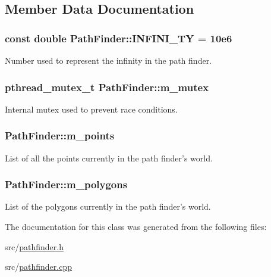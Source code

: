 \subsection{Member Data Documentation}
\hypertarget{classPathFinder_a341ee3901465d58e8aad2fc0dd227168}{
\subsubsection[{INFINI\_\-TY}]{\setlength{\rightskip}{0pt plus 5cm}const double {\bf PathFinder::INFINI\_\-TY} = 10e6}}
\label{classPathFinder_a341ee3901465d58e8aad2fc0dd227168}
Number used to represent the infinity in the path finder. \hypertarget{classPathFinder_a4a70aef3998ffdbcbf20bb67a0f884e2}{
\subsubsection[{m\_\-mutex}]{\setlength{\rightskip}{0pt plus 5cm}pthread\_\-mutex\_\-t {\bf PathFinder::m\_\-mutex}}}
\label{classPathFinder_a4a70aef3998ffdbcbf20bb67a0f884e2}
Internal mutex used to prevent race conditions. \hypertarget{classPathFinder_a90258ce800e2b170754c4779b66020ef}{
\subsubsection[{m\_\-points}]{ {\bf PathFinder::m\_\-points}}}
\label{classPathFinder_a90258ce800e2b170754c4779b66020ef}
List of all the points currently in the path finder's world. \hypertarget{classPathFinder_a4cce0fd97519e8e9974c9f6a5f046f7f}{
\subsubsection[{m\_\-polygons}]{ {\bf PathFinder::m\_\-polygons}}}
\label{classPathFinder_a4cce0fd97519e8e9974c9f6a5f046f7f}
List of the polygons currently in the path finder's world. 

The documentation for this class was generated from the following files:\begin{DoxyCompactItemize}
\item 
src/\hyperlink{pathfinder_8h}{pathfinder.h}\item 
src/\hyperlink{pathfinder_8cpp}{pathfinder.cpp}\end{DoxyCompactItemize}
